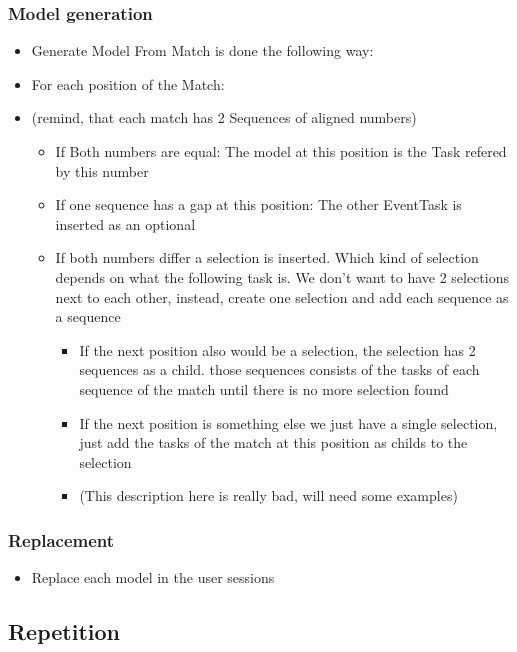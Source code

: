 \subsubsection{Model generation}
	\begin{itemize}
		\item Generate Model From Match is done the following way:
		\item For each position of the Match: 
		\item (remind, that each match has 2 Sequences of aligned numbers)
		\begin{itemize}
			\item If Both numbers are equal: The model at this position is the Task refered by this number
			\item If one sequence has a gap at this position: The other EventTask is inserted as an optional
			\item If both numbers differ a selection is inserted. Which kind of selection depends on what the following task is. We don't want to have 2 selections next to each other, instead, create one selection and add each sequence as a sequence
			\begin{itemize}
				\item If the next position also would be a selection, the selection has 2 sequences as a child. those sequences consists of the tasks of each sequence of the match until there is no more selection found 
				\item If the next position is something else we just have a single selection, just add the tasks of the match at this position as childs to the selection
				\item (This description here is really bad, will need some examples)
			\end{itemize}
		\end{itemize}
	\end{itemize}

\subsubsection{Replacement}
	\begin{itemize}
		\item Replace each model in the user sessions
	\end{itemize}

\subsection{Repetition}



